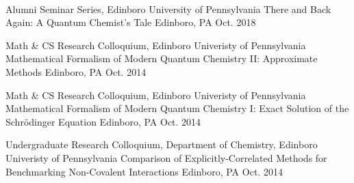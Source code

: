 \\


\begin{cventries}


  \cventry
    {Alumni Seminar Series, Edinboro University of Pennsylvania} %
    {There and Back Again: A Quantum Chemist's Tale} %
    {Edinboro, PA} %
    {Oct. 2018} %
    { }


  \cventry
    {Math \& CS Research Colloquium, Edinboro Univeristy of Pennsylvania} %
    {Mathematical Formalism of Modern Quantum Chemistry II: Approximate Methods} %
    {Edinboro, PA} %
    {Oct. 2014} %
    { }


  \cventry
    {Math \& CS Research Colloquium, Edinboro Univeristy of Pennsylvania} %
    {Mathematical Formalism of Modern Quantum Chemistry I:
    Exact Solution of the Schr\"{o}dinger Equation} %
    {Edinboro, PA} %
    {Oct. 2014} %
    { }


  \cventry
    {Undergraduate Research Colloquium, Department of Chemistry, 
    Edinboro Univeristy of Pennsylvania} %
    {Comparison of Explicitly-Correlated Methods for Benchmarking 
    Non-Covalent Interactions} %
    {Edinboro, PA} %
    {Oct. 2014} %
    { }

\end{cventries}

